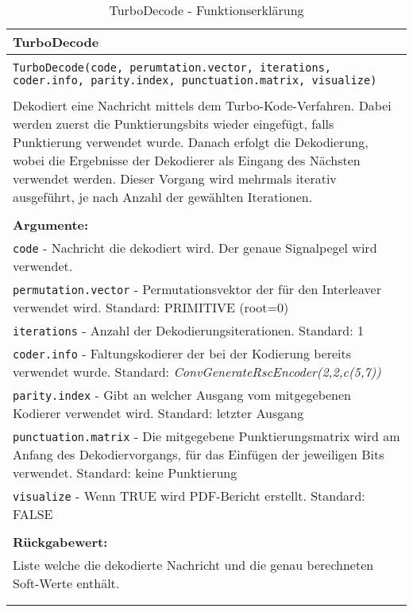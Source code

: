 \begin{longtable}{|p{\textwidth}|}
\hline
\rowcolor{lightblue}TurboDecode\\
\hline
\\
\texttt{TurboDecode(code, perumtation.vector, iterations, coder.info, parity.index, punctuation.matrix, visualize)}\\
\\
Dekodiert eine Nachricht mittels dem Turbo-Kode-Verfahren. Dabei werden zuerst die Punktierungsbits wieder eingefügt, falls Punktierung verwendet wurde. Danach erfolgt die Dekodierung, wobei die Ergebnisse der Dekodierer als Eingang des Nächsten verwendet werden. Dieser Vorgang wird mehrmals iterativ ausgeführt, je nach Anzahl der gewählten Iterationen.\\
\\
\textbf{Argumente:}\\
\texttt{code} - Nachricht die dekodiert wird. Der genaue Signalpegel wird verwendet.\\
\texttt{permutation.vector} - Permutationsvektor der für den Interleaver verwendet wird. Standard: PRIMITIVE (root=0)\\
\texttt{iterations} - Anzahl der Dekodierungsiterationen. Standard: 1\\
\texttt{coder.info} - Faltungskodierer der bei der Kodierung bereits verwendet wurde. Standard: \emph{ConvGenerateRscEncoder(2,2,c(5,7))}\\
\texttt{parity.index} - Gibt an welcher Ausgang vom mitgegebenen Kodierer verwendet wird. Standard: letzter Ausgang\\
\texttt{punctuation.matrix} - Die mitgegebene Punktierungsmatrix wird am Anfang des Dekodiervorgangs,  für das Einfügen der jeweiligen Bits verwendet. Standard: keine Punktierung\\
\texttt{visualize} - Wenn TRUE wird PDF-Bericht erstellt. Standard: FALSE\\
\\
\textbf{Rückgabewert:}\\
Liste welche die dekodierte Nachricht und die genau berechneten Soft-Werte enthält.\\
\\
\hline
\caption[TurboDecode]{TurboDecode - Funktionserklärung}
\end{longtable}